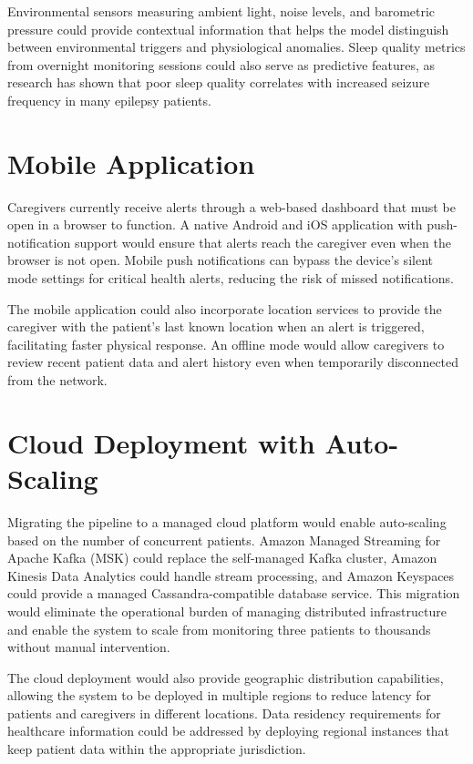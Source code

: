\documentclass[12pt, a4paper, oneside]{report}
\begin{document}
Environmental sensors measuring ambient light, noise levels, and barometric pressure could provide contextual information that helps the model distinguish between environmental triggers and physiological anomalies. Sleep quality metrics from overnight monitoring sessions could also serve as predictive features, as research has shown that poor sleep quality correlates with increased seizure frequency in many epilepsy patients.

\section{Mobile Application}

Caregivers currently receive alerts through a web-based dashboard that must be open in a browser to function. A native Android and iOS application with push-notification support would ensure that alerts reach the caregiver even when the browser is not open. Mobile push notifications can bypass the device's silent mode settings for critical health alerts, reducing the risk of missed notifications.

The mobile application could also incorporate location services to provide the caregiver with the patient's last known location when an alert is triggered, facilitating faster physical response. An offline mode would allow caregivers to review recent patient data and alert history even when temporarily disconnected from the network.

\section{Cloud Deployment with Auto-Scaling}

Migrating the pipeline to a managed cloud platform would enable auto-scaling based on the number of concurrent patients. Amazon Managed Streaming for Apache Kafka (MSK) could replace the self-managed Kafka cluster, Amazon Kinesis Data Analytics could handle stream processing, and Amazon Keyspaces could provide a managed Cassandra-compatible database service. This migration would eliminate the operational burden of managing distributed infrastructure and enable the system to scale from monitoring three patients to thousands without manual intervention.

The cloud deployment would also provide geographic distribution capabilities, allowing the system to be deployed in multiple regions to reduce latency for patients and caregivers in different locations. Data residency requirements for healthcare information could be addressed by deploying regional instances that keep patient data within the appropriate jurisdiction.
\end{document}
